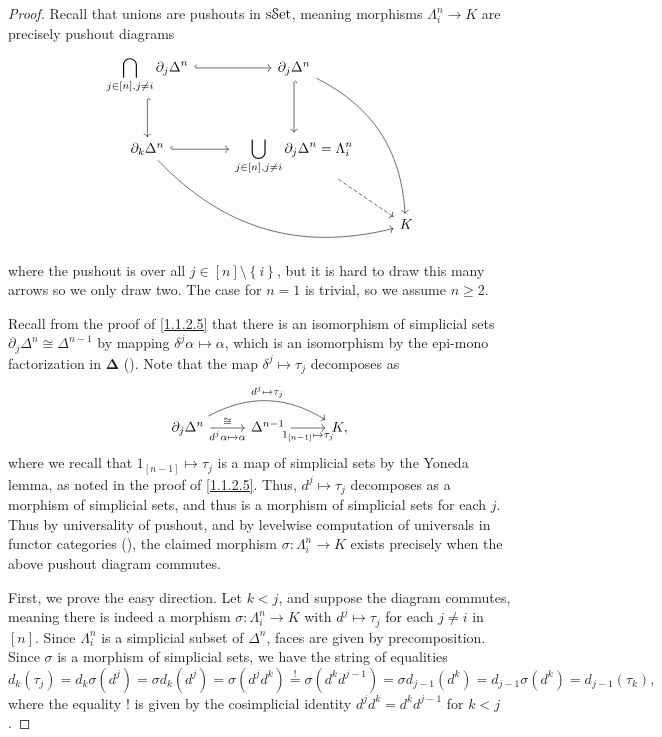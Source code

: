 \begin{proof}
	Recall that unions are pushouts in $\mathrm{s}\mathcal{S}\mathrm{et}$, meaning morphisms $\Lambda _i^n\to K$ are precisely pushout diagrams
	\[\begin{tikzcd}[row sep = 2.5em, column sep = 2.5em]
		\displaystyle{\bigcap_{j\in[n],j\neq i} \partial _j\Delta ^{n} } \ar[hook, r] \ar[hook, d] & \partial _j\Delta ^{n} \ar[bend left, ddr] \ar[hook, d]  &  \\
		\partial _k\Delta ^{n} \ar[hook, r] \ar[bend right, drr]  & \displaystyle{\bigcup_{j\in[n],j\neq i} \partial _j\Delta ^{n} =\Lambda_i^n}\ar[dashed, dr]  &  \\
	 &  & K
	\end{tikzcd}\]
	where the pushout is over all $j\in[n]\setminus \left\{ i \right\} $, but it is hard to draw this many arrows so we only draw two. The case for $n=1$ is trivial, so we assume $n\geq 2$.

	Recall from the proof of \cref{1.1.2.5} that there is an isomorphism of simplicial sets $\partial _j\Delta ^{n} \cong \Delta ^{n-1} $ by mapping $\delta ^{j} \alpha \mapsto \alpha $, which is an isomorphism by the epi-mono factorization in $\boldsymbol{\Delta} $ (\cite{maclane,ssets}). Note that the map $\delta ^j\mapsto \tau _j$ decomposes as
	\[\begin{tikzcd}[row sep = 2.5em, column sep = 2.5em]
		\partial _j\Delta ^{n} \ar[" d^j\mapsto \tau _j ", bend left, rr] \ar[" d^j\alpha \mapsto \alpha  "', " \cong  ", r]  & \Delta ^{n-1} \ar[" 1_{[n-1]} \mapsto \tau _j "', r]  & K,
	\end{tikzcd}\]
	where we recall that $1_{[n-1]} \mapsto \tau_j$ is a map of simplicial sets by the Yoneda lemma, as noted in the proof of \cref{1.1.2.5}. Thus, $d^j\mapsto \tau _j$ decomposes as a morphism of simplicial sets, and thus is a morphism of simplicial sets for each $j$. Thus by universality of pushout, and by levelwise computation of universals in functor categories (\cite{maclane}), the claimed morphism $\sigma :\Lambda _i^n\to K$ exists precisely when the above pushout diagram commutes.

	First, we prove the easy direction. Let $k<j$, and suppose the diagram commutes, meaning there is indeed a morphism $\sigma : \Lambda _i^n \to K$ with $d^j\mapsto \tau _j$ for each $j\neq i$ in $[n]$. Since $\Lambda _i^n$ is a simplicial subset of $\Delta ^{n} $, faces are given by precomposition. Since $\sigma $ is a morphism of simplicial sets, we have the string of equalities
	\[
		d_k(\tau _j)=d_k\sigma (d^j)=\sigma d_k(d^j)=\sigma (d^jd^k)\overset{!}{=}\sigma (d^kd^{j-1} )=\sigma d_{j-1} (d^k)=d_{j-1} \sigma (d^k)=d_{j-1} (\tau _k)
	,\]
	where the equality $!$ is given by the cosimplicial identity $d^jd^k=d^kd^{j-1} $ for $k<j$.


\end{proof}
